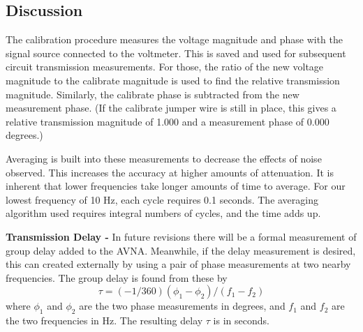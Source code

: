 %
\subsection{Discussion}
\label{subsect:TDiscus}
The calibration procedure measures the voltage magnitude and phase with the signal source connected to the voltmeter.  This is saved and used for subsequent  circuit transmission measurements.  For those, the ratio of the new voltage magnitude to the calibrate magnitude is used to find the relative transmission magnitude.  Similarly, the calibrate phase is subtracted from the new measurement phase.  (If the calibrate jumper wire is still in place, this gives a relative transmission magnitude of 1.000 and a measurement phase of 0.000 degrees.)

Averaging is built into these measurements to decrease the effects of noise observed.  This increases the accuracy at higher amounts of attenuation.  It is inherent that lower frequencies take longer amounts of time to average.  For our lowest frequency of 10 Hz, each cycle requires 0.1 seconds.  The averaging algorithm used requires integral numbers of cycles, and the time adds up.

\textbf{Transmission Delay - }In future revisions there will be a formal measurement of group delay added to the AVNA.  Meanwhile, if the delay measurement is desired, this can created externally by using a pair of phase measurements at two nearby frequencies.  The group delay is found from these by
\begin{equation}
\tau=(-1/360)(\phi_1-\phi_2)/(f_1-f_2)
\end{equation}
where $\phi_1$ and $\phi_2$ are the two phase measurements in degrees, and $f_1$ and $f_2$ are the two frequencies in Hz.  The resulting delay $\tau$ is in seconds.
